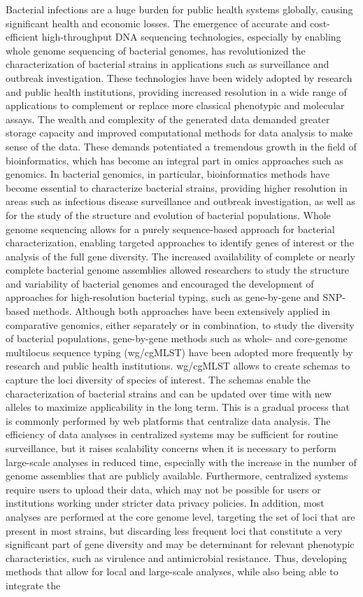 Bacterial infections are a huge burden for public health systems globally, causing significant health and economic losses. The emergence of accurate and cost-efficient high-throughput DNA sequencing technologies, especially by enabling whole genome sequencing of bacterial genomes, has revolutionized the characterization of bacterial strains in applications such as surveillance and outbreak investigation. These technologies have been widely adopted by research and public health institutions, providing increased resolution in a wide range of applications to complement or replace more classical phenotypic and molecular assays. The wealth and complexity of the generated data demanded greater storage capacity and improved computational methods for data analysis to make sense of the data. These demands potentiated a tremendous growth in the field of bioinformatics, which has become an integral part in omics approaches such as genomics. In bacterial genomics, in particular, bioinformatics methods have become essential to characterize bacterial strains, providing higher resolution in areas such as infectious disease surveillance and outbreak investigation, as well as for the study of the structure and evolution of bacterial populations. Whole genome sequencing allows for a purely sequence-based approach for bacterial characterization, enabling targeted approaches to identify genes of interest or the analysis of the full gene diversity. The increased availability of complete or nearly complete bacterial genome assemblies allowed researchers to study the structure and variability of bacterial genomes and encouraged the development of approaches for high-resolution bacterial typing, such as gene-by-gene and SNP-based methods. Although both approaches have been extensively applied in comparative genomics, either separately or in combination, to study the diversity of bacterial populations, gene-by-gene methods such as whole- and core-genome multilocus sequence typing (wg/cgMLST) have been adopted more frequently by research and public health institutions. wg/cgMLST allows to create schemas to capture the loci diversity of species of interest. The schemas enable the characterization of bacterial strains and can be updated over time with new alleles to maximize applicability in the long term. This is a gradual process that is commonly performed by web platforms that centralize data analysis. The efficiency of data analyses in centralized systems may be sufficient for routine surveillance, but it raises scalability concerns when it is necessary to perform large-scale analyses in reduced time, especially with the increase in the number of genome assemblies that are publicly available. Furthermore, centralized systems require users to upload their data, which may not be possible for users or institutions working under stricter data privacy policies. In addition, most analyses are performed at the core genome level, targeting the set of loci that are present in most strains, but discarding less frequent loci that constitute a very significant part of gene diversity and may be determinant for relevant phenotypic characteristics, such as virulence and antimicrobial resistance. Thus, developing methods that allow for local and large-scale analyses, while also being able to integrate the 